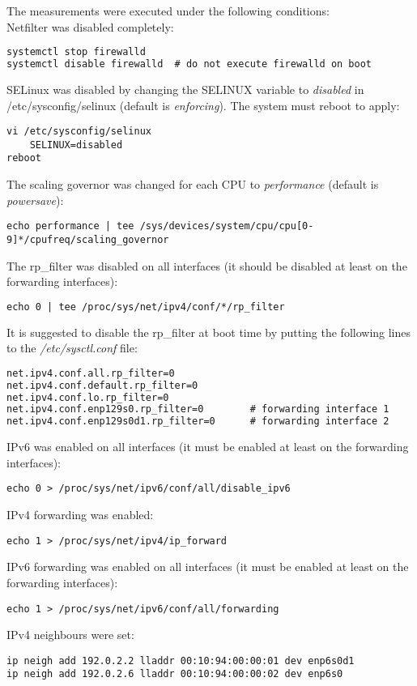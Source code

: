 The measurements were executed under the following conditions:
\\
Netfilter was disabled completely:
\begin{lstlisting}[language=TeX]
systemctl stop firewalld
systemctl disable firewalld  # do not execute firewalld on boot
\end{lstlisting}
SELinux was disabled by changing the SELINUX variable to {\it{disabled}} in /etc/sysconfig/selinux
(default is {\it{enforcing}}). The system must reboot to apply:
\begin{lstlisting}
vi /etc/sysconfig/selinux
	SELINUX=disabled
reboot
\end{lstlisting}
The scaling governor was changed for each CPU to {\it{performance}} (default is {\it{powersave}}):
\begin{lstlisting}
echo performance | tee /sys/devices/system/cpu/cpu[0-9]*/cpufreq/scaling_governor
\end{lstlisting}
The rp\_filter was disabled on all interfaces (it should be disabled at least on the forwarding interfaces):
\begin{lstlisting}[language=TeX]
echo 0 | tee /proc/sys/net/ipv4/conf/*/rp_filter
\end{lstlisting}
It is suggested to disable the rp\_filter at boot time by putting the following lines to the {\it{/etc/sysctl.conf}} file:
\begin{lstlisting}[language=TeX]
net.ipv4.conf.all.rp_filter=0
net.ipv4.conf.default.rp_filter=0
net.ipv4.conf.lo.rp_filter=0
net.ipv4.conf.enp129s0.rp_filter=0        # forwarding interface 1
net.ipv4.conf.enp129s0d1.rp_filter=0      # forwarding interface 2
\end{lstlisting}
IPv6 was enabled on all interfaces (it must be enabled at least on the forwarding interfaces):
\begin{lstlisting}
echo 0 > /proc/sys/net/ipv6/conf/all/disable_ipv6
\end{lstlisting}
IPv4 forwarding was enabled:
\begin{lstlisting}
echo 1 > /proc/sys/net/ipv4/ip_forward
\end{lstlisting}
IPv6 forwarding was enabled on all interfaces (it must be enabled at least on the forwarding interfaces):
\begin{lstlisting}
echo 1 > /proc/sys/net/ipv6/conf/all/forwarding
\end{lstlisting}
IPv4 neighbours were set:
\begin{lstlisting}
ip neigh add 192.0.2.2 lladdr 00:10:94:00:00:01 dev enp6s0d1
ip neigh add 192.0.2.6 lladdr 00:10:94:00:00:02 dev enp6s0
\end{lstlisting}

